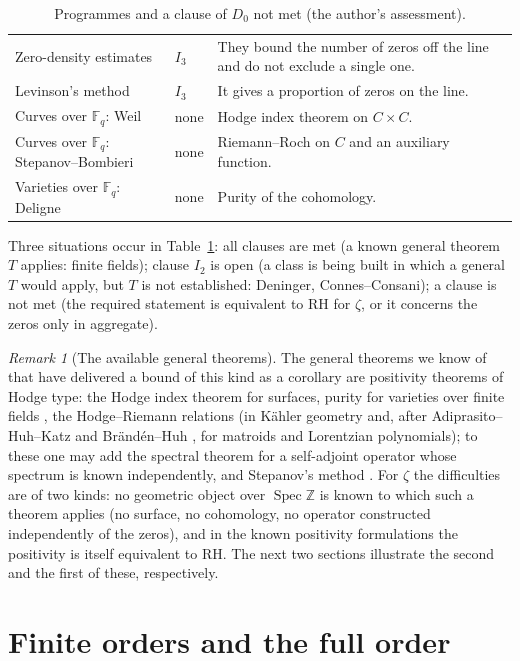 \documentclass[11pt]{amsart}
\theoremstyle{definition}
\theoremstyle{remark}
\newtheorem{remark}[theorem]{Remark}
\newcommand{\bbZ}{\mathbb{Z}}
\newcommand{\bbF}{\mathbb{F}}
\begin{document}
\begin{table}[ht]
\begin{tabular}{>{\raggedright\arraybackslash}p{4.7cm}>{\raggedright\arraybackslash}p{1.5cm}>{\raggedright\arraybackslash}p{8.6cm}}
Zero-density estimates \cite[Ch.~9]{bgTitchmarsh} & $I_3$ &
They bound the number of zeros off the line and do not exclude a single one.\\
Levinson's method \cite{Levinson74,Conrey89} & $I_3$ &
It gives a proportion of zeros on the line.\\
Curves over $\bbF_q$: Weil \cite{Weil48} & none &
Hodge index theorem on $C\times C$.\\
Curves over $\bbF_q$: Stepanov--Bombieri \cite{Stepanov69,Bombieri74} & none &
Riemann--Roch on $C$ and an auxiliary function.\\
Varieties over $\bbF_q$: Deligne \cite{Deligne74,Deligne80} & none &
Purity of the cohomology.\\
\hline
\end{tabular}
\medskip
\caption{Programmes and a clause of $D_0$ not met (the author's
assessment).}\label{tab:cal}
\end{table}

Three situations occur in Table~\ref{tab:cal}: all clauses are met (a known
general theorem $T$ applies: finite fields); clause $I_2$ is open (a class is
being built in which a general $T$ would apply, but $T$ is not established:
Deninger, Connes--Consani); a clause is not met (the required statement is
equivalent to RH for $\zeta$, or it concerns the zeros only in aggregate).

\begin{remark}[The available general theorems]
The general theorems we know of that have delivered a bound of this kind as a
corollary are positivity theorems of Hodge type: the Hodge index theorem for
surfaces, purity for varieties over finite fields \cite{Deligne74,Deligne80}, the
Hodge--Riemann relations (in K\"ahler geometry and, after
Adiprasito--Huh--Katz \cite{AHK18} and Br\"and\'en--Huh \cite{BrandenHuh20},
for matroids and Lorentzian polynomials); to these one may add the spectral
theorem for a self-adjoint operator whose spectrum is known independently, and
Stepanov's method \cite{Stepanov69,Bombieri74}. For $\zeta$ the difficulties
are of two kinds: no geometric object over $\operatorname{Spec}\bbZ$ is known
to which such a theorem applies (no surface, no cohomology, no operator
constructed independently of the zeros), and in the known positivity
formulations the positivity is itself equivalent to RH. The next two sections
illustrate the second and the first of these, respectively.
\end{remark}

\section{Finite orders and the full order}\label{sec:gap}
\end{document}
